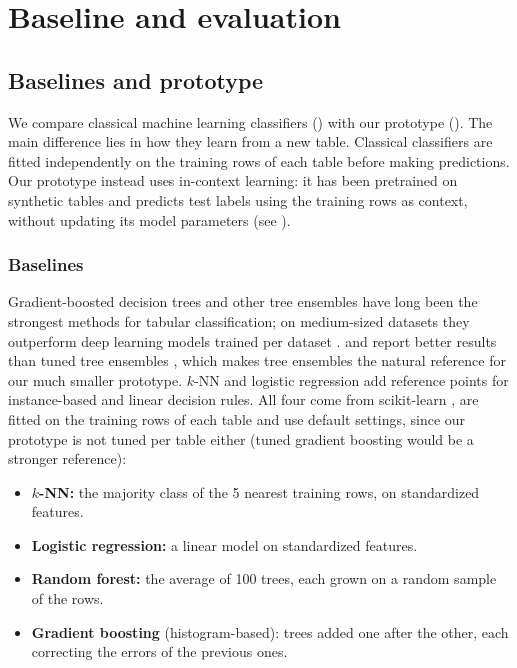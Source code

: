 \section{Baseline and evaluation}\label{sec:evaluation}

\subsection{Baselines and prototype}\label{sec:baselines}

We compare classical machine learning classifiers
() with our \tabicl{} prototype
(). The main difference
lies in how they learn from a new table. Classical
classifiers are fitted independently on the training
rows of each table before making predictions.
Our prototype instead uses in-context learning:
it has been pretrained on synthetic tables and
predicts test labels using the training rows as
context, without updating its model parameters (see ).

\subsubsection{Baselines}\label{sec:baseline_models}

Gradient-boosted decision trees and other tree ensembles have long been the
strongest methods for tabular classification; on medium-sized datasets they
outperform deep learning models trained per dataset
\citep{grinsztajn2022tree}. \tabpfn{} and \tabicl{} report better results
than tuned tree ensembles \citep{hollmann2025tabpfn,qu2026tabiclv2}, which
makes tree ensembles the natural reference for our much smaller prototype.
$k$-NN and logistic regression add reference points for instance-based and
linear decision rules. All four come from scikit-learn
\citep{pedregosa2011sklearn}, are fitted on the training rows of each table
and use default settings, since our prototype is not tuned per table either
(tuned gradient boosting would be a stronger reference):
\begin{itemize}
  \item \textbf{$k$-NN:} the majority class of the 5 nearest training rows,
    on standardized features.
  \item \textbf{Logistic regression:} a linear model on standardized
    features.
  \item \textbf{Random forest:} the average of 100 trees, each grown on a
    random sample of the rows.
  \item \textbf{Gradient boosting} (histogram-based): trees added one after
    the other, each correcting the errors of the previous ones.
\end{itemize}

